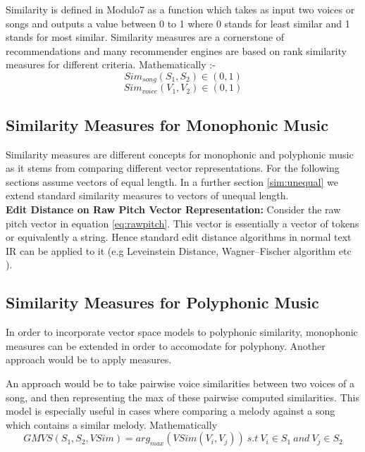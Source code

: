 \noindent Similarity is defined in Modulo7 as a function which takes as input two voices or songs and outputs a value between 0 to 1 where 0 stands for least similar and 1 stands for most similar. Similarity measures are a cornerstone of recommendations and many recommender engines are based on rank similarity measures for different criteria. Mathematically :-
\begin{equation}
Sim_{song}(S_1, S_2) \in (0, 1)
\end{equation}
\begin{equation}
Sim_{voice}(V_1, V_2) \in (0, 1)
\end{equation}

\subsection{Similarity Measures for Monophonic Music}

\noindent Similarity measures are different concepts for monophonic and polyphonic music as it stems from comparing different vector representations. For the following sections assume vectors of equal length. In a further section \ref{sim:unequal} we extend standard similarity measures to vectors of unequal length. \\

\noindent \textbf{Edit Distance on Raw Pitch Vector Representation:} Consider the raw pitch vector in equation \ref{eq:rawpitch}. This vector is essentially a vector of tokens or equivalently a string. Hence standard edit distance algorithms in normal text IR can be applied to it (e.g Leveinstein Distance, Wagner–Fischer algorithm etc \cite{simtour}).

\subsection{Similarity Measures for Polyphonic Music}

\noindent In order to incorporate vector space models to polyphonic similarity, monophonic measures can be extended in order to accomodate for polyphony. Another approach would be to apply measures.

 An approach would be to take pairwise voice similarities between two voices of a song, and then representing the max of these pairwise computed similarities. This model is especially useful in cases where comparing a melody against a song which contains a similar melody. Mathematically 
\begin{equation}
GMVS(S_1, S_2, VSim) = arg_{max} (VSim(V_i, V_j)) \ s.t \ V_i \in S_1 \ and \ V_j \in S_2
\end{equation}

